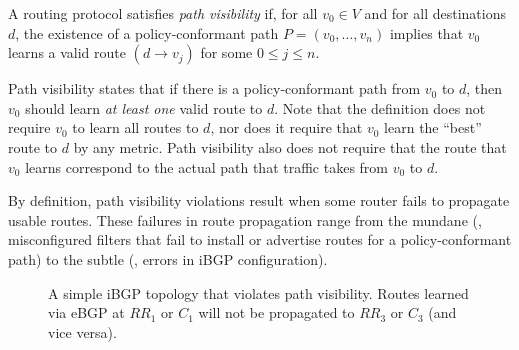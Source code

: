 \begin{defn}\label{defn:pv}
A routing protocol satisfies {\em path visibility} if, for all $v_0\in
V$ and for all destinations $d$, the existence of a policy-conformant
path $P = (v_0, \ldots, v_n)$ implies that $v_0$ learns a valid route
$(d \rightarrow v_j)$ for some $0 \leq j \leq n$.
\end{defn}

Path visibility states that if there is a policy-conformant
path from $v_0$ to $d$, then $v_0$ should learn {\em at least one} valid
route to $d$.  Note that the definition does not require $v_0$ to learn
all routes to $d$, nor does it require that $v_0$ learn the ``best''
route to $d$ by any metric.  Path visibility also does not require that
the route that $v_0$ learns correspond to the actual path that traffic
takes from $v_0$ to $d$.

By definition, path visibility violations result when some router fails
to propagate usable routes. These failures in route propagation 
range from the mundane (\eg, misconfigured filters that fail to
install or advertise routes for a policy-conformant path) to the subtle
(\eg, errors in iBGP configuration).

\begin{figure}
\begin{center}
\begin{psfrags}
\end{psfrags}
\end{center}
\caption[A simple iBGP topology that violates path visibility.]{A simple
  iBGP topology that violates path visibility.  Routes learned via eBGP
  at $RR_1$ or $C_1$ will not be propagated to $RR_3$ or $C_3$ (and vice
  versa).}
\label{fig:rl:ibgp_rr}
\end{figure}


